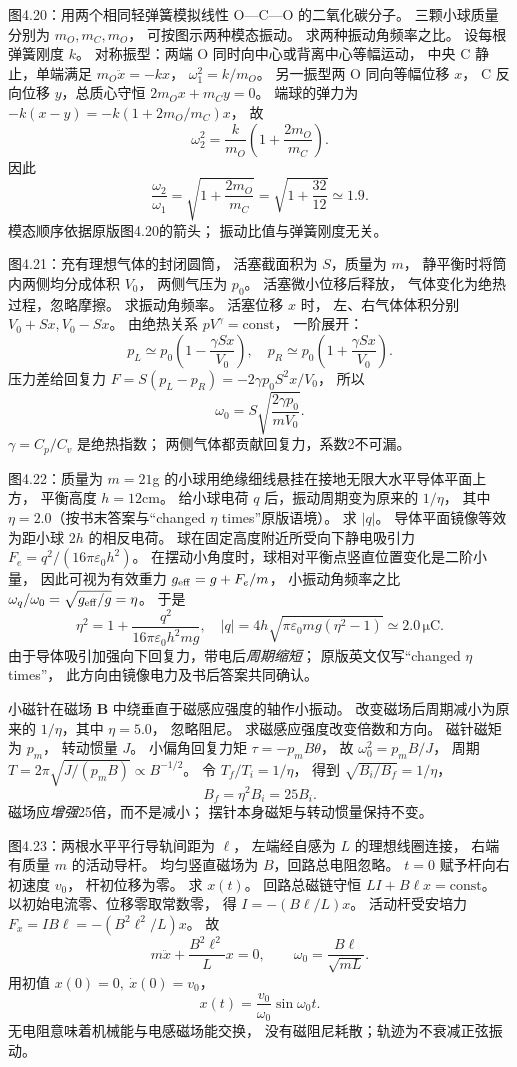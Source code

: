 图4.20：用两个相同轻弹簧模拟线性
O—C—O 的二氧化碳分子。
三颗小球质量分别为
$m_O,m_C,m_O$，
可按图示两种模态振动。
求两种振动角频率之比。
\exsolution
设每根弹簧刚度 $k$。
对称振型：两端 O 同时向中心或背离中心等幅运动，
中央 C 静止，单端满足
$m_O\ddot x=-kx$，
$\omega_1^2=k/m_O$。
另一振型两 O 同向等幅位移 $x$，
C 反向位移 $y$，总质心守恒
$2m_Ox+m_Cy=0$。
端球的弹力为
$-k(x-y)=-k(1+2m_O/m_C)x$，
故
\[
\omega_2^2=\frac{k}{m_O}
\left(1+\frac{2m_O}{m_C}\right).
\]
因此
\[
\boxed{\frac{\omega_2}{\omega_1}
=\sqrt{1+\frac{2m_O}{m_C}}
=\sqrt{1+\frac{32}{12}}\simeq1.9}.
\]
\excheck 模态顺序依据原版图4.20的箭头；
振动比值与弹簧刚度无关。

图4.21：充有理想气体的封闭圆筒，
活塞截面积为 $S$，质量为 $m$，
静平衡时将筒内两侧均分成体积 $V_0$，
两侧气压为 $p_0$。
活塞微小位移后释放，
气体变化为绝热过程，忽略摩擦。
求振动角频率。
\exsolution
活塞位移 $x$ 时，
左、右气体体积分别
$V_0+Sx,V_0-Sx$。
由绝热关系 $pV^\gamma=\mathrm{const}$，
一阶展开：
\[
p_L\simeq p_0\left(1-\frac{\gamma Sx}{V_0}\right),
\quad
p_R\simeq p_0\left(1+\frac{\gamma Sx}{V_0}\right).
\]
压力差给回复力
$F=S(p_L-p_R)
=-2\gamma p_0S^2x/V_0$，
所以
\[
\boxed{\omega_0=S
\sqrt{\frac{2\gamma p_0}{mV_0}}}.
\]
\excheck $\gamma=C_p/C_v$ 是绝热指数；
两侧气体都贡献回复力，系数2不可漏。

图4.22：质量为 $m=21$g 的小球用绝缘细线悬挂在接地无限大水平导体平面上方，
平衡高度 $h=12$cm。
给小球电荷 $q$ 后，振动周期变为原来的 $1/\eta$，
其中 $\eta=2.0$（按书末答案与“changed $\eta$ times”原版语境）。
求 $|q|$。
\exsolution
导体平面镜像等效为距小球 $2h$ 的相反电荷。
球在固定高度附近所受向下静电吸引力
$F_e=q^2/(16\pi\varepsilon_0h^2)$。
在摆动小角度时，球相对平衡点竖直位置变化是二阶小量，
因此可视为有效重力
$g_{\rm eff}=g+F_e/m$，
小振动角频率之比
$\omega_q/\omega_0=\sqrt{g_{\rm eff}/g}=\eta$。
于是
\[
\eta^2=1+\frac{q^2}{16\pi\varepsilon_0h^2mg},
\quad
\boxed{|q|=4h\sqrt{\pi\varepsilon_0mg(\eta^2-1)}
\simeq2.0\,\mathrm{\mu C}}.
\]
\excheck 由于导体吸引加强向下回复力，带电后\emph{周期缩短}；
原版英文仅写“changed $\eta$ times”，
此方向由镜像电力及书后答案共同确认。

小磁针在磁场 $\bm B$ 中绕垂直于磁感应强度的轴作小振动。
改变磁场后周期减小为原来的
$1/\eta$，其中 $\eta=5.0$，
忽略阻尼。
求磁感应强度改变倍数和方向。
\exsolution
磁针磁矩为 $p_m$，
转动惯量 $J$。
小偏角回复力矩
$\tau=-p_mB\theta$，
故
$\omega_0^2=p_mB/J$，
周期
$T=2\pi\sqrt{J/(p_mB)}\propto B^{-1/2}$。
令 $T_f/T_i=1/\eta$，
得到
$\sqrt{B_i/B_f}=1/\eta$，
\[
\boxed{B_f=\eta^2B_i=25B_i}.
\]
\excheck 磁场应\emph{增强}25倍，而不是减小；
摆针本身磁矩与转动惯量保持不变。

图4.23：两根水平平行导轨间距为 $\ell$，
左端经自感为 $L$ 的理想线圈连接，
右端有质量 $m$ 的活动导杆。
均匀竖直磁场为 $B$，回路总电阻忽略。
$t=0$ 赋予杆向右初速度 $v_0$，
杆初位移为零。
求 $x(t)$。
\exsolution
回路总磁链守恒
$LI+B\ell x=\mathrm{const}$。
以初始电流零、位移零取常数零，
得
$I=-(B\ell/L)x$。
活动杆受安培力
$F_x=IB\ell=-(B^2\ell^2/L)x$。
故
\[
m\ddot x+\frac{B^2\ell^2}{L}x=0,
\qquad
\omega_0=\frac{B\ell}{\sqrt{mL}}.
\]
用初值 $x(0)=0,\ \dot x(0)=v_0$，
\[
\boxed{x(t)=\frac{v_0}{\omega_0}\sin\omega_0t}.
\]
\excheck 无电阻意味着机械能与电感磁场能交换，
没有磁阻尼耗散；轨迹为不衰减正弦振动。
